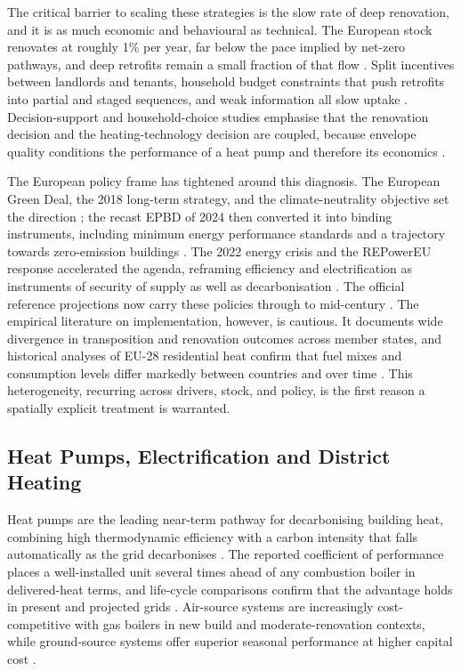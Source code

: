 The critical barrier to scaling these strategies is the slow rate of deep
renovation, and it is as much economic and behavioural as technical. The European
stock renovates at roughly 1\% per year, far below the pace implied by net-zero
pathways, and deep retrofits remain a small fraction of that flow
\citep{Esser2019renovation,Filippidou2019}. Split
incentives between landlords and tenants, household budget constraints that push
retrofits into partial and staged sequences, and weak information all slow uptake
\citep{Arbulu2022Barriers,Maia2024Household}.
Decision-support and household-choice studies emphasise that the renovation
decision and the heating-technology decision are coupled, because envelope
quality conditions the performance of a heat pump and therefore its economics
\citep{Mel2023Decisionsupport,Lingard2020Residential}.

The European policy frame has tightened around this diagnosis. The European Green
Deal, the 2018 long-term strategy, and the climate-neutrality objective set the
direction \citep{EuropeanCommission2020GreenDeal,EuropeanCommission2018LTS}; the recast EPBD of 2024 then
converted it into binding instruments, including minimum energy performance
standards and a trajectory towards zero-emission buildings
\citep{EPBD2024,Mdua2023Towards}. The 2022 energy crisis and the
REPowerEU response accelerated the agenda, reframing efficiency and
electrification as instruments of security of supply as well as decarbonisation
\citep{REpowerEU2022,EUCommissionSWD2022}.
The official reference projections now carry these policies through to mid-century
\citep{EC2024RefScenario}. The empirical literature on implementation, however,
is cautious. It documents wide divergence in transposition and renovation outcomes
across member states, and historical analyses of EU-28 residential heat confirm
that fuel mixes and consumption levels differ markedly between countries and over
time \citep{Mdua2023Towards,Cyx2020EU28Heat}. This
heterogeneity, recurring across drivers, stock, and policy, is the first reason a
spatially explicit treatment is warranted.

\subsection{Heat Pumps, Electrification and District Heating}
\label{sec:lit:hp}

Heat pumps are the leading near-term pathway for decarbonising building heat, combining
high thermodynamic efficiency with a carbon intensity that falls automatically as the
grid decarbonises \citep{IEA2022heatpumps,HPTEC2026WEO2025}. The reported coefficient of
performance places a well-installed unit several times ahead of any combustion boiler in
delivered-heat terms, and life-cycle comparisons confirm that the advantage holds in
present and projected grids \citep{Famiglietti2022Heat,Dong2023}. Air-source systems are
increasingly cost-competitive with gas boilers in new build and moderate-renovation
contexts, while ground-source systems offer superior seasonal performance at higher
capital cost \citep{Kim2023,Hoseinpoori2022}.

